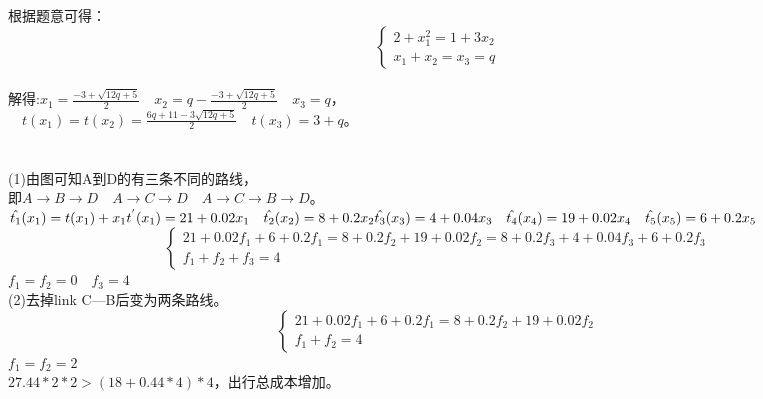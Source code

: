 \documentclass[12pt]{article}
\begin{document}
\section{}
\noindent
根据题意可得：
\begin{equation*}
\left\{
    \begin{array}{l}
        2+x_1^{2}=1+3x_2 \\
        x_1+x_2=x_3=q 
    \end{array}
\right. 
\end{equation*}\\
解得:$x_1=\frac{-3+\sqrt{12q+5}}{2} \quad x_2=q-\frac{-3+\sqrt{12q+5}}{2} \quad x_3=q$，\\
$\quad t(x_1)=t(x_2)=\frac{6q+11-3\sqrt{12q+5}}{2} \quad t(x_3)=3+q$。
\section{}
\noindent
(1)由图可知A到D的有三条不同的路线，\\
即$A\to B\to D \quad A\to C\to D \quad A\to C\to B\to D$。\\
$\hat{t_1}(x_1)=t(x_1)+x_1t^{'}(x_1)=21+0.02x_1 \quad \hat{t_2}(x_2)=8+0.2x_2 \\
 \hat{t_3}(x_3)=4+0.04x_3 \quad \hat{t_4}(x_4)=19+0.02x_4 \quad \hat{t_5}(x_5)=6+0.2x_5$
\begin{equation*}
    \left\{
        \begin{array}{l}
            21+0.02f_1+6+0.2f_1=8+0.2f_2+19+0.02f_2=8+0.2f_3+4+0.04f_3+6+0.2f_3\\
            f_1+f_2+f_3=4
        \end{array}
        \right.
\end{equation*}
$f_1=f_2=0 \quad f_3=4$\\
(2)去掉link C—B后变为两条路线。\\
\begin{equation*}
    \left\{
        \begin{array}{l}
            21+0.02f_1+6+0.2f_1=8+0.2f_2+19+0.02f_2 \\
            f_1+f_2=4
        \end{array}
        \right.
\end{equation*}
$f_1=f_2=2$\\
$27.44*2*2>(18+0.44*4)*4$，出行总成本增加。
\end{document}
